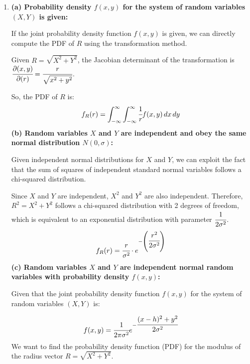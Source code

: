 \documentclass{article}
\begin{document}
\begin{enumerate}
\newpage
\item
    \textbf{(a) Probability density $f(x, y)$ for the system of random variables $(X, Y)$ is given:}

    If the joint probability density function $f(x, y)$ is given, we can directly compute the PDF of $R$ using the transformation method.

    Given $R = \sqrt{X^2 + Y^2}$, the Jacobian determinant of the transformation is $\cfrac{\partial(x, y)}{\partial(r)} = \cfrac{r}{\sqrt{x^2 + y^2}}$.

    So, the PDF of $R$ is:
    \[ 
        f_R(r) = \int_{-\infty}^{\infty} \int_{-\infty}^{\infty} \cfrac{1}{r} f(x, y) \,dx \,dy
    \]
    \textbf{(b) Random variables $X$ and $Y$ are independent and obey the same normal distribution $N(0, \sigma)$:}

    Given independent normal distributions for $X$ and $Y$, we can exploit the fact that the sum of squares of independent standard normal variables follows a chi-squared distribution.

    Since $X$ and $Y$ are independent, $X^2$ and $Y^2$ are also independent. Therefore, $R^2 = X^2 + Y^2$ follows a chi-squared distribution with 2 degrees of freedom, which is equivalent to an exponential distribution with parameter $\cfrac{1}{2\sigma^2}$.
    \[ 
        f_R(r) = \cfrac{r}{\sigma^2}\cdot e^{-\left(\cfrac{r^2}{2\sigma^2}\right)} 
    \]
    \textbf{(c) Random variables $X$ and $Y$ are independent normal random variables with probability density $f(x, y)$:}

    Given that the joint probability density function \( f(x, y) \) for the system of random variables \( (X, Y) \) is:

    \[ 
        f(x, y) = \cfrac{1}{2\pi\sigma^2} e^{-\cfrac{(x - h)^2 + y^2}{2\sigma^2}} 
    \]
    We want to find the probability density function (PDF) for the modulus of the radius vector \( R = \sqrt{X^2 + Y^2} \).


\end{enumerate}
\end{document}

